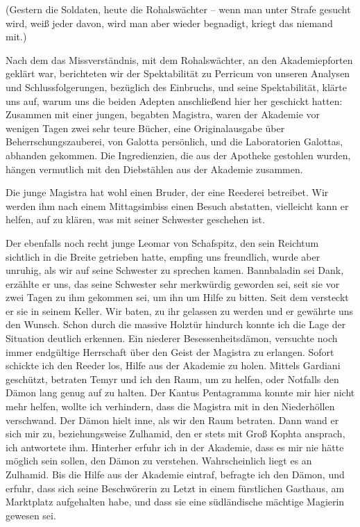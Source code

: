 (Gestern die Soldaten, heute die Rohalswächter -- wenn man unter Strafe gesucht wird, weiß jeder davon, wird man aber wieder begnadigt, kriegt das niemand mit.)

Nach dem das Missverständnis, mit dem Rohalswächter, an den Akademiepforten geklärt war, berichteten wir der Spektabilität zu Perricum von unseren Analysen und Schlussfolgerungen, bezüglich des Einbruchs, und seine Spektabilität, klärte uns auf, warum uns die beiden Adepten anschließend hier her geschickt hatten: Zusammen mit einer jungen, begabten Magistra, waren der Akademie vor wenigen Tagen zwei sehr teure Bücher, eine Originalausgabe über Beherrschungszauberei, von Galotta persönlich, und die Laboratorien Galottas, abhanden gekommen. Die Ingredienzien, die aus der Apotheke gestohlen wurden, hängen vermutlich mit den Diebstählen aus der Akademie zusammen.

Die junge Magistra hat wohl einen Bruder, der eine Reederei betreibet. Wir werden ihm nach einem Mittagsimbiss einen Besuch abstatten, vielleicht kann er helfen, auf zu klären, was mit seiner Schwester geschehen ist.

Der ebenfalls noch recht junge Leomar von Schafspitz, den sein Reichtum sichtlich in die Breite getrieben hatte, empfing uns freundlich, wurde aber unruhig, als wir auf seine Schwester zu sprechen kamen. Bannbaladin sei Dank, erzählte er uns, das seine Schwester sehr merkwürdig geworden sei, seit sie vor zwei Tagen zu ihm gekommen sei, um ihn um Hilfe zu bitten. Seit dem versteckt er sie in seinem Keller. Wir baten, zu ihr gelassen zu werden und er gewährte uns den Wunsch. Schon durch die massive Holztür hindurch konnte ich die Lage der Situation deutlich erkennen. Ein niederer Besessenheitsdämon, versuchte noch immer endgültige Herrschaft über den Geist der Magistra zu erlangen. Sofort schickte ich den Reeder los, Hilfe aus der Akademie zu holen. Mittels Gardiani geschützt, betraten Temyr und ich den Raum, um zu helfen, oder Notfalls den Dämon lang genug auf zu halten. Der Kantus Pentagramma konnte mir hier nicht mehr helfen, wollte ich verhindern, dass die Magistra mit in den Niederhöllen verschwand. Der Dämon hielt inne, als wir den Raum betraten. Dann wand er sich mir zu, beziehungsweise Zulhamid, den er stets mit Groß Kophta ansprach, ich antwortete ihm. Hinterher erfuhr ich in der Akademie, dass es mir nie hätte möglich sein sollen, den Dämon zu verstehen. Wahrscheinlich liegt es an Zulhamid. Bis die Hilfe aus der Akademie eintraf, befragte ich den Dämon, und erfuhr, dass sich seine Beschwörerin zu Letzt in einem fürstlichen Gasthaus, am Marktplatz aufgehalten habe, und dass sie eine südländische mächtige Magierin gewesen sei.

